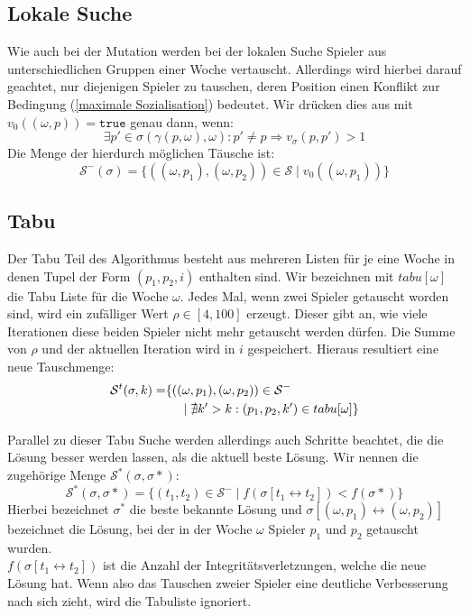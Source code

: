 \subsection{Lokale Suche}
Wie auch bei der Mutation werden bei der lokalen Suche Spieler aus unterschiedlichen Gruppen einer Woche vertauscht. 
Allerdings wird hierbei darauf geachtet, nur diejenigen Spieler zu tauschen, deren Position einen Konflikt zur  Bedingung (\ref{maximale Sozialisation}) bedeutet. 
Wir drücken dies aus mit $v_0((\omega, p)) = \texttt{true}$ genau dann, wenn:
\begin{equation}
  \exists p' \in \sigma(\gamma(p,\omega), \omega): p' \neq p \Rightarrow v_\sigma(p, p') > 1
\end{equation}
Die Menge der hierdurch möglichen Täusche ist:
\begin{equation}
  \mathcal{S}^-(\sigma) = \{ ((\omega, p_1), (\omega, p_2)) \in \mathcal{S} \;|\; v_0((\omega, p_1)) \}
\end{equation}


\subsection{Tabu}
Der Tabu Teil des Algorithmus besteht aus mehreren Listen für je eine Woche in denen Tupel der Form $(p_1, p_2, i)$ enthalten sind. Wir bezeichnen mit $tabu[\omega]$ die Tabu Liste für die Woche $\omega$. 
Jedes Mal, wenn zwei Spieler getauscht worden sind, wird ein zufälliger Wert $\rho \in [4, 100]$ erzeugt. Dieser gibt an, wie viele Iterationen diese beiden Spieler nicht mehr getauscht werden dürfen. Die Summe von $\rho$ und der aktuellen Iteration wird in $i$ gespeichert. Hieraus resultiert eine neue Tauschmenge:
\begin{equation}
\begin{split} 
  \mathcal{S}^t(\sigma, k) = & \{ ((\omega, p_1), (\omega, p_2)) \in \mathcal{S}^- \\
    & \hspace{5 mm} | \; \nexists k' > k: (p_1, p_2, k') \in tabu[\omega] \}
\end{split} 
\end{equation}

Parallel zu dieser Tabu Suche werden allerdings auch Schritte beachtet, die die Lösung besser werden lassen, als die aktuell beste Lösung. Wir nennen die zugehörige Menge $\mathcal{S}^*(\sigma, \sigma*)$:
\begin{equation}
  \mathcal{S}^*(\sigma, \sigma*) = \{ (t_1, t_2) \in \mathcal{S}^- \;|\; f(\sigma [t_1 \leftrightarrow t_2] ) < f(\sigma *) \}
\end{equation}
Hierbei bezeichnet $\sigma^*$ die beste bekannte Lösung und $\sigma [(\omega, p_1) \leftrightarrow (\omega, p_2)]$ bezeichnet die Lösung, bei der in der  Woche $\omega$ Spieler $p_1$ und $p_2$ getauscht wurden.\\
$f(\sigma [t_1 \leftrightarrow t_2])$ ist die Anzahl der Integritätsverletzungen, welche die neue Lösung hat.
Wenn also das Tauschen zweier Spieler eine deutliche Verbesserung nach sich zieht, wird die Tabuliste ignoriert.

